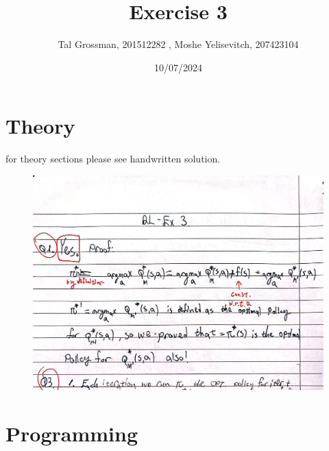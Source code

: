 \documentclass{assignmeownt}
\title{Exercise 3}
\author{Tal Grossman, 201512282 , Moshe Yelisevitch, 207423104}
\date{10/07/2024}
\begin{document}
\maketitle
\thispagestyle{firststyle}
\section{Theory}
for theory sections please see handwritten solution.

\begin{figure}[h]
    \centering
    \includegraphics[width=\textwidth]{HW3_solution_Q1.jpg}
\end{figure}




\newpage
\section{Programming}
\end{document}
